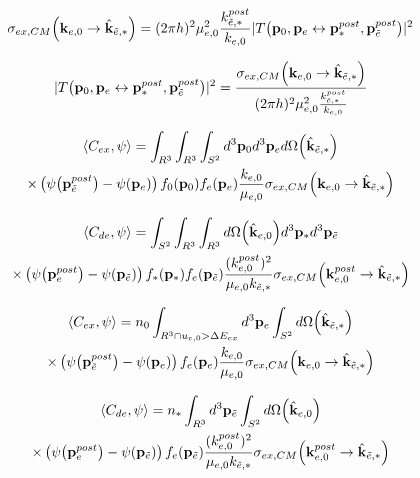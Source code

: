 \documentclass{article}[draft]
\begin{document}
\begin{align*}
\sigma_{ex,CM} \of{ \vect{k}_{e,0} \rightarrow \hat{\vect{k}}_{\te,*}} 
= (2\pi h)^2 
\mu_{e,0}^2 \frac{k_{\te,*}^{post}}{k_{e,0}}
| T\of{\vect{p}_0, \vect{p}_e \leftrightarrow \vect{p}_*^{post}, \vect{p}_\te^{post}} |^2
\end{align*}

\begin{align*}
| T\of{\vect{p}_0, \vect{p}_e \leftrightarrow \vect{p}_*^{post}, \vect{p}_\te^{post}} |^2 = 
\frac{\sigma_{ex,CM} \of{ \vect{k}_{e,0} \rightarrow \hat{\vect{k}}_{\te,*}}} 
{(2\pi h)^2 \mu_{e,0}^2 \frac{k_{\te,*}^{post}}{k_{e,0}}}
\end{align*}

\begin{multline*}
\left< C_{ex}, \psi \right> = 
\int_{R^3} \int_{R^3} 
\int_{S^2}
d^3 \vect{p}_0 d^3 \vect{p}_e
d \Omega\of{\hat{\vect{k}}_{\te,*}}
\\
\times
\left( \psi\of{\vect{p}_\te^{post}} - \psi\of{\vect{p}_e} \right) 
f_0\of{\vect{p}_0} f_e\of{\vect{p}_e} 
\frac{k_{e,0}}{\mu_{e,0}}
\sigma_{ex,CM} \of{ \vect{k}_{e,0} \rightarrow \hat{\vect{k}}_{\te,*}}
\end{multline*}

\begin{multline*}
\left< C_{de}, \psi \right> = 
\int_{S^2}
\int_{R^3} \int_{R^3}
d \Omega\of{\hat{\vect{k}}_{e,0}}
d^3 \vect{p}_* d^3 \vect{p}_\te  
\\
\times
\left( \psi\of{\vect{p}_e^{post}} - \psi\of{\vect{p}_\te} \right) 
f_*\of{\vect{p}_*} f_e\of{\vect{p}_\te} 
\frac{(k_{e,0}^{post})^2}{\mu_{e,0} k_{\te,*}}
\sigma_{ex,CM} \of{ \vect{k}_{e,0}^{post} \rightarrow \hat{\vect{k}}_{\te,*}}
\end{multline*}


\begin{multline*}
\left< C_{ex}, \psi \right> = 
n_0
\int_{R^3 \cap u_{e,0} > \Delta E_{ex}}
d^3 \vect{p}_e
\int_{S^2}
d \Omega\of{\hat{\vect{k}}_{\te,*}}
\\
\times
\left( \psi\of{\vect{p}_\te^{post}} - \psi\of{\vect{p}_e} \right) 
f_e\of{\vect{p}_e} 
\frac{k_{e,0}}{\mu_{e,0}}
\sigma_{ex,CM} \of{ \vect{k}_{e,0} \rightarrow \hat{\vect{k}}_{\te,*}}
\end{multline*}

\begin{multline*}
\left< C_{de}, \psi \right> = 
n_*
\int_{R^3}
d^3 \vect{p}_\te  
\int_{S^2}
d \Omega\of{\hat{\vect{k}}_{e,0}}
\\
\times
\left( \psi\of{\vect{p}_e^{post}} - \psi\of{\vect{p}_\te} \right) 
f_e\of{\vect{p}_\te} 
\frac{(k_{e,0}^{post})^2}{\mu_{e,0} k_{\te,*}}
\sigma_{ex,CM} \of{ \vect{k}_{e,0}^{post} \rightarrow \hat{\vect{k}}_{\te,*}}
\end{multline*}
\end{document}
